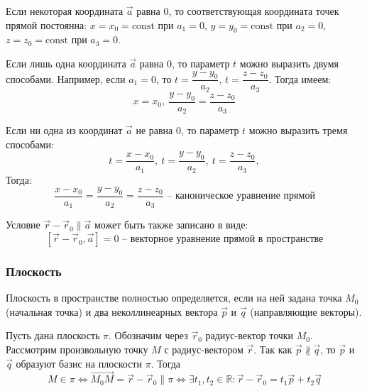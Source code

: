 \documentclass[12pt, a4paper, reqno]{article}
\begin{document}
    Если некоторая координата $\vec{a}$ равна 0, то соответствующая координата точек прямой постоянна:
    $x = x_0 = \text{const}$ при $a_1 = 0$, $y = y_0 = \text{const}$ при $a_2 = 0$,
    $z = z_0 = \text{const}$ при $a_3 = 0$.

    Если лишь одна координата $\vec{a}$ равна 0, то параметр $t$ можно выразить двумя способами.
    Например, если $a_1 = 0$, то $t = \dfrac{y - y_0}{a_2}$, $t = \dfrac{z - z_0}{a_3}$. Тогда имеем:
    \begin{equation*}
        x = x_0,\ \frac{y - y_0}{a_2} = \frac{z - z_0}{a_3}
    \end{equation*}

    Если ни одна из координат $\vec{a}$ не равна 0, то параметр $t$ можно выразить тремя способами:
    \begin{equation*}
        t = \frac{x - x_0}{a_1},\ t = \frac{y - y_0}{a_2},\ t = \frac{z - z_0}{a_3},
    \end{equation*}
    Тогда:
    \begin{equation*}
        \boxed{\frac{x - x_0}{a_1} = \frac{y - y_0}{a_2} = \frac{z - z_0}{a_3}}
        \text{ -- каноническое уравнение прямой}
    \end{equation*}

    Условие $\vec{r} - \vec{r}_0 \parallel \vec{a}$ может быть также записано в виде:
    \begin{equation*}
        \boxed{[\vec{r} - \vec{r}_0, \vec{a}] = 0}\text{ -- векторное уравнение прямой в пространстве}
    \end{equation*}

    \subsubsection{Плоскость}

    Плоскость в пространстве полностью определяется, если на ней задана точка $M_0$ (начальная точка)
    и два неколлинеарных вектора $\vec{p}$ и $\vec{q}$ (направляющие векторы).

    Пусть дана плоскость $\pi$. Обозначим через $\vec{r}_0$ радиус-вектор точки $M_0$. Рассмотрим
    произвольную точку $M$ с радиус-вектором $\vec{r}$. Так как $\vec{p} \nparallel \vec{q}$,
    то $\vec{p}$ и $\vec{q}$ образуют базис на плоскости $\pi$. Тогда
    \begin{equation*}
        M \in \pi \iff
        \overrightarrow{M_0M} = \vec{r} - \vec{r}_0 \parallel \pi \iff
        \exists t_1, t_2 \in \mathbb{R}: \vec{r} - \vec{r}_0 = t_1\vec{p} + t_2\vec{q}
    \end{equation*}
\end{document}
